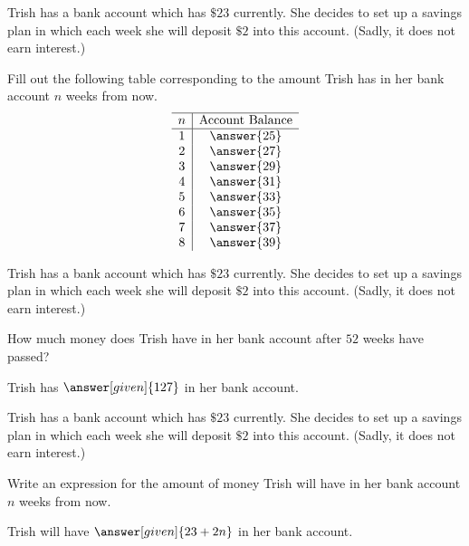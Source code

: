 \documentclass[nooutcomes]{ximera}
\begin{document}
\begin{problem}
Trish has a bank account which has $\$23$ currently.  She decides to set up a savings plan in which each week she will deposit $\$2$ into this account. (Sadly, it does not earn interest.)

Fill out the following table corresponding to the amount Trish has in her bank account $n$ weeks from now.
\[
\begin{array}{c|c} \hline
n & \text{Account Balance} \\ \hline
1 & \answer{25} \\
2 & \answer{27} \\
3 & \answer{29}\\
4 & \answer{31}\\
5 & \answer{33}\\
6 & \answer{35}\\
7 & \answer{37}\\
8 & \answer{39}\\
\end{array}
\]
\end{problem}



\begin{problem}
Trish has a bank account which has $\$23$ currently.  She decides to set up a savings plan in which each week she will deposit $\$2$ into this account. (Sadly, it does not earn interest.)

How much money does Trish have in her bank account after $52$ weeks have passed?

\begin{prompt}
Trish has $\answer[given]{127}$ in her bank account.
\end{prompt}
\end{problem}




\begin{problem}
Trish has a bank account which has $\$23$ currently.  She decides to set up a savings plan in which each week she will deposit $\$2$ into this account. (Sadly, it does not earn interest.)

Write an expression for the amount of money Trish will have in her bank account $n$ weeks from now.

\begin{prompt}
Trish will have $\answer[given]{23+2n}$ in her bank account.
\end{prompt}
\end{problem}
\end{document}
